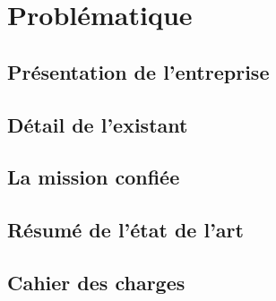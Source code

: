 \chapter{Problématique}

\section{Présentation de l’entreprise}

\section{Détail de l’existant}

\section{La mission confiée}

\section{Résumé de l’état de l’art}

\section{Cahier des charges}

